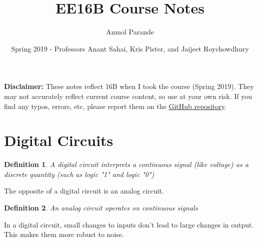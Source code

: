\documentclass{article}
\newtheorem{definition}{Definition}
\begin{document}
\title{EE16B Course Notes}
\author{Anmol Parande}
\date{Spring 2019 - Professors Anant Sahai, Kris Pister, and Jaijeet Roychowdhury}
\maketitle
\tableofcontents
\newpage
\textbf{Disclaimer: }These notes reflect 16B when I took the course (Spring 2019). They may not accurately reflect current course content, so use at your own risk.
If you find any typos, errors, etc, please report them on the \href{https://github.com/parandea17/BerkeleyNotes}{GitHub repository}.\\
\section{Digital Circuits}
\begin{definition}
    A digital circuit interprets a continuous signal (like voltage) as a discrete quantity (such as logic "1" and logic "0")\\
    \begin{figure}[!h]
    \centering
    \end{figure}
\end{definition}
The opposite of a digital circuit is an analog circuit.
\begin{definition}
    An analog circuit operates on continuous signals
\end{definition}
In a digital circuit, small changes to inputs don't lead to large changes in output. This makes them more robust to noise.
\end{document}
